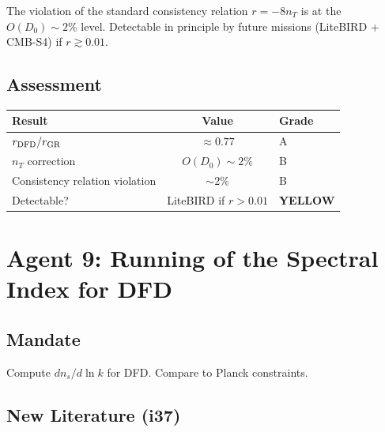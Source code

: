 \documentclass[11pt,a4paper]{article}
\newcommand{\YELLOW}{\textcolor{dfdyellow}{\textbf{YELLOW}}}
\begin{document}
The violation of the standard consistency relation $r = -8n_T$ is at the $O(D_0) \sim 2\%$ level. Detectable in principle by future missions (LiteBIRD + CMB-S4) if $r \gtrsim 0.01$.

\subsection{Assessment}

\begin{center}
\begin{tabular}{lcl}
\toprule
\textbf{Result} & \textbf{Value} & \textbf{Grade} \\
\midrule
$r_{\rm DFD}/r_{\rm GR}$ & $\approx 0.77$ & A \\
$n_T$ correction & $O(D_0) \sim 2\%$ & B \\
Consistency relation violation & $\sim 2\%$ & B \\
Detectable? & LiteBIRD if $r > 0.01$ & \YELLOW \\
\bottomrule
\end{tabular}
\end{center}

\newpage
\section{Agent 9: Running of the Spectral Index for DFD}
\label{sec:agent9}

\subsection{Mandate}

Compute $dn_s/d\ln k$ for DFD. Compare to Planck constraints.

\subsection{New Literature (i37)}
\end{document}
